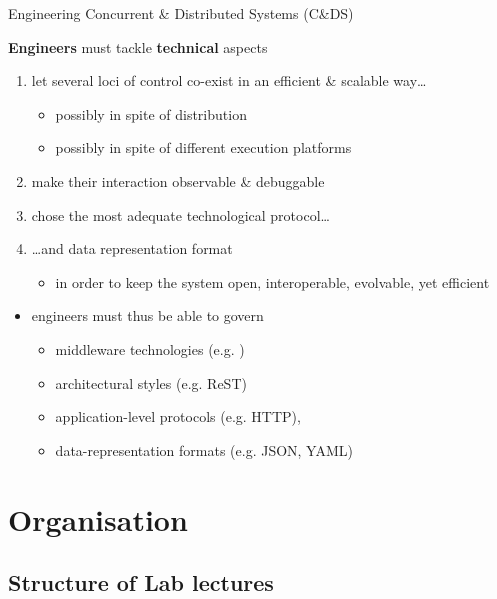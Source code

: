 \documentclass[presentation]{beamer}\mode<presentation>{\usetheme{AMSCesenaPurpleAndGold}}
\begin{document}
\begin{frame}[c,allowframebreaks]{Engineering Concurrent \& Distributed Systems (C\&DS)}
	\begin{block}{\textbf{Engineers} must tackle \textbf{technical} aspects}
		\begin{enumerate}
			\item let several loci of control \alert{co-exist} in an efficient \& scalable way\ldots
			\begin{itemize}
				\item possibly in spite of \alert{distribution}
				\item possibly in spite of different \alert{execution platforms}
			\end{itemize}
			\item make their interaction \alert{observable \& debuggable}
			\item chose the most adequate technological protocol\ldots
			\item \ldots and data representation format
			\begin{itemize}
				\item in order to keep the system open, interoperable, evolvable, yet efficient
			\end{itemize}
		\end{enumerate}
	\end{block}

	\medskip

	\begin{itemize}
		\item engineers must thus be able to govern
		\begin{itemize}
			\item middleware technologies (e.g. \jade{})
			\item architectural styles (e.g. ReST)
			\item application-level protocols (e.g. HTTP),
			\item data-representation formats (e.g. JSON, YAML)
		\end{itemize}

	\end{itemize}

\end{frame}

\section{Organisation}

\subsection{Structure of Lab lectures}
\end{document}
